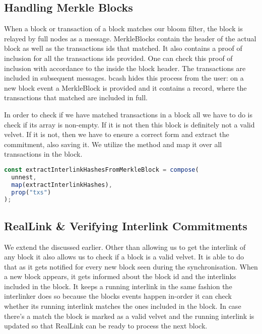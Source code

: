 \subsection{Handling Merkle Blocks}
When a block or transaction of a block matches our bloom filter, the block is relayed by full nodes as a  message. MerkleBlocks contain the header of the actual block as well as the transactions ids that matched. It also contains a proof of inclusion for all the transactions ids provided. One can check this proof of inclusion with accordance to the  inside the block header. The transactions are included in subsequent  messages. bcash hides this process from the user: on a new block event a MerkleBlock is provided and it contains a  record, where the transactions that matched are included in full.

In order to check if we have matched transactions in a block all we have to do is check if its  array is non-empty. If it is not then this block is definitely not a valid velvet. If it is not, then we have to ensure a correct form and extract the commitment, also saving it. We utilize the method  and map it over all transactions in the block.

\begin{lstlisting}[language=Javascript]
const extractInterlinkHashesFromMerkleBlock = compose(
  unnest,
  map(extractInterlinkHashes),
  prop("txs")
);
\end{lstlisting}

\subsection{RealLink \& Verifying Interlink Commitments}
We extend the  discussed earlier. Other than allowing us to get the interlink of any block it also allows us to check if a block is a valid velvet. It is able to do that as it gets notified for every new block seen during the synchronisation. When a new block appears, it gets informed about the block id and the interlinks included in the block. It keeps a running interlink in the same fashion the interlinker does so because the blocks events happen in-order it can check whether its running interlink matches the ones included in the block. In case there's a match the block is marked as a valid velvet and the running interlink is updated so that RealLink can be ready to process the next block.

